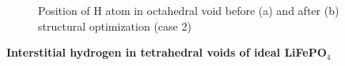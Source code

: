 \begin{figure}[ht]
\begin{minipage}[h]{0.49\linewidth}
\end{minipage}
\hfill
\begin{minipage}[ht]{0.49\linewidth}
\end{minipage}
\caption{Position of H atom in octahedral void before (a) and after (b) structural optimization (case 2)}
\label{ris:oct2}
\end{figure}

\textbf{Interstitial hydrogen in tetrahedral voids of ideal LiFePO$_4$}

